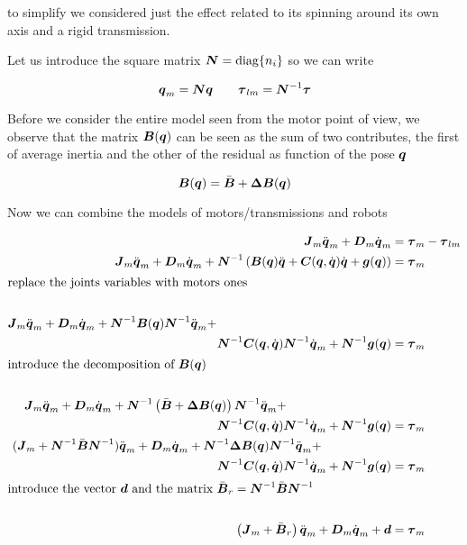 to simplify we considered just the effect related to its spinning around its own axis and a rigid transmission.

Let us introduce the square matrix $\boldsymbol{N} = \operatorname{diag}\{n_i\}$ so we can write

\[
    \boldsymbol{q}_m = \boldsymbol{N} \boldsymbol{q} \qquad \boldsymbol{\tau}_{lm} = \boldsymbol{N}^{-1} \boldsymbol{\tau}
\]

Before we consider the entire model seen from the motor point of view, we observe that the matrix $\boldsymbol{B}(\boldsymbol{q})$ can be seen as the sum of two contributes, the first of average inertia and the other of the residual as function of the pose $\boldsymbol{q}$

\[
    \boldsymbol{B}(\boldsymbol{q}) = \bar{\boldsymbol{B}} + \boldsymbol{\Delta B}(\boldsymbol{q})
\]

Now we can combine the models of motors/transmissions and robots

\begin{align*}
    \matr J_m\ddq_m + \matr D_m \dq_m &= \vect \tau_m - \vect \tau_{lm} \\
    \matr J_m\ddq_m + \matr D_m \dq_m + \matr N^{-1} \left( \matr{B}(\q)\ddq +
    \matr{C}(\q,\dq)\dq + \vect{g}(\q) \right) &= \vect \tau_m \\
    \intertext{replace the joints variables with motors ones} \\
    \matr J_m\ddq_m + \matr D_m \dq_m + \matr N^{-1} \matr{B}(\q) \matr N^{-1} \ddq_m + \hspace{5cm} \\
    \matr N^{-1} \matr{C}(\q,\dq) \matr N^{-1} \dq_m +
    \matr N^{-1} \vect{g}(\q) &= \vect \tau_m \\
    \intertext{introduce the decomposition of $\matr B(\q)$} \\
    \matr J_m\ddq_m + \matr D_m \dq_m + \matr N^{-1} \left(\bar{\matr B} + \matr{\Delta B}(\q)\right) \matr N^{-1} \ddq_m + \hspace{3cm} \\
    \matr N^{-1} \matr{C}(\q,\dq) \matr N^{-1} \dq_m +
    \matr N^{-1} \vect{g}(\q) &= \vect \tau_m \\
    (\matr J_m + \matr N^{-1} \bar{\matr B} \matr N^{-1} )\ddq_m + \matr D_m \dq_m +
    \matr N^{-1} \matr{\Delta B}(\q) \matr N^{-1} \ddq_m + \hspace{2cm} \\
    \matr N^{-1} \matr{C}(\q,\dq) \matr N^{-1} \dq_m +
    \matr N^{-1} \vect{g}(\q) &= \vect \tau_m \\
    \intertext{introduce the vector $\vect d$ and the matrix $\bar{\matr B}_r = \matr N^{-1} \bar{\matr B} \matr N^{-1}$} \\
    \left(\matr J_m + \bar{\matr B}_r \right)\ddq_m + \matr D_m \dq_m + \vect d &= \vect \tau_m
\end{align*}

